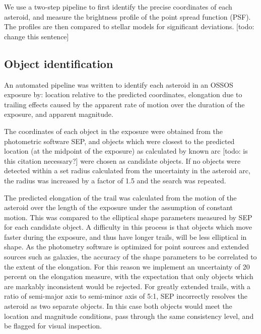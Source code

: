 \documentclass[iop,apj]{emulateapj}
\begin{document}
We use a two-step pipeline to first identify the precise coordinates of each asteroid, and measure the brightness profile of the point spread function (PSF). The profiles are then compared to stellar models for significant deviations. [todo: change this sentence]

\subsection{Object identification}

An automated pipeline was written to identify each asteroid in an OSSOS exposure by: location relative to the predicted coordinates,  elongation due to trailing effects caused by the apparent rate of motion over the duration of the exposure, and apparent magnitude. 

The coordinates of each object in the exposure were obtained from the photometric software SEP, and objects which were closest to the predicted location (at the midpoint of the exposure) as calculated by known arc \citep{jpl} [todo: is this citation necessary?] were chosen as candidate objects. If no objects were detected within a set radius calculated from the uncertainty in the asteroid arc, the radius was increased by a factor of 1.5 and the search was repeated.

The predicted elongation of the trail was calculated from the motion of the asteroid over the length of the exposure \citep{jpl} under the assumption of constant motion. This was compared to the elliptical shape parameters measured by SEP for each candidate object. 
A difficulty in this process is that objects which move faster during the exposure, and thus have longer trails, will be less elliptical in shape. As the photometry software is optimized for point sources and extended sources such as galaxies, the accuracy of the shape parameters to be correlated to the extent of the elongation. For this reason we implement an uncertainty of 20 percent on the elongation measure, with the expectation that only objects which are markably inconsistent would be rejected. For greatly extended trails, with a ratio of semi-major axis to semi-minor axis of 5:1, SEP incorrectly resolves the asteroid as two separate objects. In this case both objects would meet the location and magnitude conditions, pass through the same consistency level, and be flagged for visual inspection.
\end{document}
